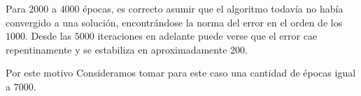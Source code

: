 Para $2000$ a $4000$ épocas, es correcto asumir que el algoritmo todavía no había convergido a una solución, encontrándose la norma del error en el orden de los $1000$. Desde las $5000$ iteraciones en adelante puede verse que el error cae repentinamente y se estabiliza en aproximadamente $200$.  

Por este motivo Consideramos tomar para este caso una cantidad de épocas igual a $7000$.


